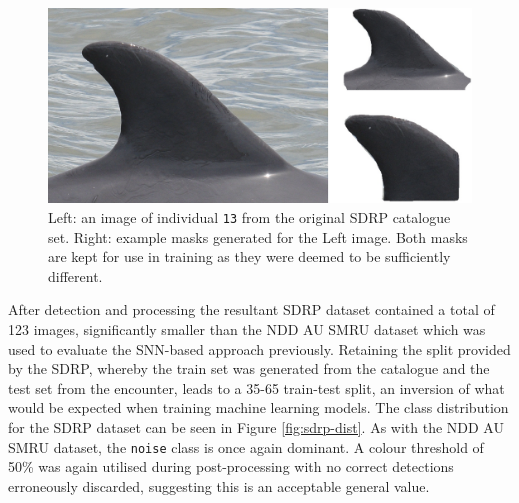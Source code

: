 \begin{figure}
	\begin{center}
		\includegraphics[scale=0.5]{Chapter6/figs/SDRP-double-mask-eg-indv-13.png}
	\end{center}
	\caption[Left: an image of individual \texttt{13} from the original SDRP catalogue set. Right: example masks generated for the Left image.]{Left: an image of individual \texttt{13} from the original SDRP catalogue set. Right: example masks generated for the Left image. Both masks are kept for use in training as they were deemed to be sufficiently different.}
	\label{fig:sdrp-double-mask-eg}
\end{figure}

After detection and processing the resultant SDRP dataset contained a total of 123 images, significantly smaller than the NDD AU SMRU dataset which was used to evaluate the SNN-based approach previously. Retaining the split provided by the SDRP, whereby the train set was generated from the catalogue and the test set from the encounter, leads to a 35-65 train-test split, an inversion of what would be expected when training machine learning models. The class distribution for the SDRP dataset can be seen in Figure \ref{fig:sdrp-dist}. As with the NDD AU SMRU dataset, the \texttt{noise} class is once again dominant. A colour threshold of 50\% was again utilised during post-processing with no correct detections erroneously discarded, suggesting this is an acceptable general value.

